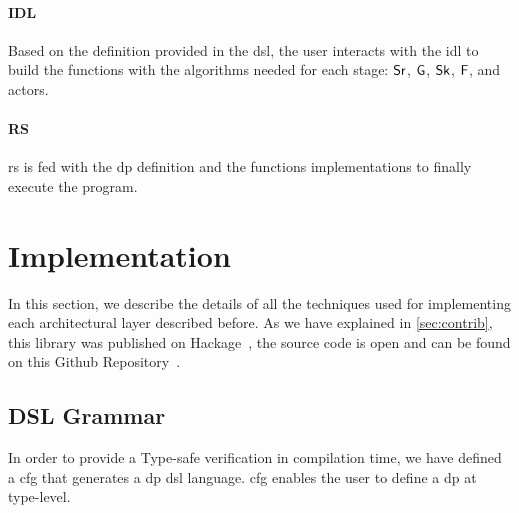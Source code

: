 \paragraph{IDL} Based on the definition provided in the \acrshort{dsl}, the user interacts with the \acrshort{idl} to build the functions with the algorithms needed for each stage: $\mathsf{Sr}$, $\mathsf{G}$, $\mathsf{Sk}$, $\mathsf{F}$, and actors. 

\paragraph{RS} \acrshort{rs} is fed with the \acrshort{dp} definition and the functions implementations to finally execute the program. 

\section{Implementation}
In this section, we describe the details of all the techniques used for implementing each architectural layer described before.
As we have explained in \autoref{sec:contrib}, this library was published on Hackage~\cite{dynamic-pipeline}, the source code is open and can be found on this Github Repository~\cite{dynamic-pipeline-git}.

\subsection{DSL Grammar}\label{sub:sec:dsl-gram}
In order to provide a Type-safe verification in compilation time, we have defined a \acrfull{cfg} that generates a \acrshort{dp} \acrshort{dsl} language. 
\acrshort{cfg} enables the user to define a \acrshort{dp} at type-level. 

